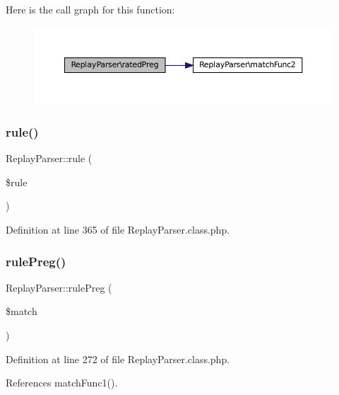 Here is the call graph for this function\+:\nopagebreak
\begin{figure}[H]
\begin{center}
\leavevmode
\includegraphics[width=350pt]{class_replay_parser_abde1f69b95e0b0f1960b92e79cc0ac46_cgraph}
\end{center}
\end{figure}
\mbox{\label{class_replay_parser_adb498edf75134b50c3ccc4ca93727640}} 
\subsubsection{\texorpdfstring{rule()}{rule()}}
{\footnotesize\ttfamily Replay\+Parser\+::rule (\begin{DoxyParamCaption}\item[{}]{\$rule }\end{DoxyParamCaption})}



Definition at line 365 of file Replay\+Parser.\+class.\+php.

\mbox{\label{class_replay_parser_ab8290a1fa1d0dce5b391fc53ad808775}} 
\subsubsection{\texorpdfstring{rule\+Preg()}{rulePreg()}}
{\footnotesize\ttfamily Replay\+Parser\+::rule\+Preg (\begin{DoxyParamCaption}\item[{}]{\$match }\end{DoxyParamCaption})}



Definition at line 272 of file Replay\+Parser.\+class.\+php.



References match\+Func1().

